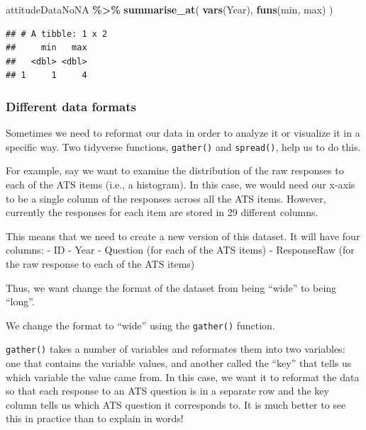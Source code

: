 \documentclass[
  12pt,
]{book}
\newenvironment{Shaded}{\begin{snugshade}}{\end{snugshade}}
\newcommand{\FunctionTok}[1]{\textcolor[rgb]{0.13,0.29,0.53}{\textbf{#1}}}
\newcommand{\NormalTok}[1]{#1}
\newcommand{\SpecialCharTok}[1]{\textcolor[rgb]{0.81,0.36,0.00}{\textbf{#1}}}
\begin{document}
\begin{Shaded}
\begin{Highlighting}[]
\NormalTok{attitudeDataNoNA }\SpecialCharTok{\%\textgreater{}\%} 
  \FunctionTok{summarise\_at}\NormalTok{(}
    \FunctionTok{vars}\NormalTok{(Year),}
    \FunctionTok{funs}\NormalTok{(min, max)}
\NormalTok{  )}
\end{Highlighting}
\end{Shaded}

\begin{verbatim}
## # A tibble: 1 x 2
##     min   max
##   <dbl> <dbl>
## 1     1     4
\end{verbatim}

\hypertarget{different-data-formats}{%
\subsubsection{Different data formats}\label{different-data-formats}}

Sometimes we need to reformat our data in order to analyze it or visualize it in a specific way. Two tidyverse functions, \texttt{gather()} and \texttt{spread()}, help us to do this.

For example, say we want to examine the distribution of the raw responses to each of the ATS items (i.e., a histogram). In this case, we would need our x-axis to be a single column of the responses across all the ATS items. However, currently the responses for each item are stored in 29 different columns.

This means that we need to create a new version of this dataset. It will have four columns:
- ID
- Year
- Question (for each of the ATS items)
- ResponseRaw (for the raw response to each of the ATS items)

Thus, we want change the format of the dataset from being ``wide'' to being ``long''.

We change the format to ``wide'' using the \texttt{gather()} function.

\texttt{gather()} takes a number of variables and reformates them into two variables: one that contains the variable values, and another called the ``key'' that tells us which variable the value came from. In this case, we want it to reformat the data so that each response to an ATS question is in a separate row and the key column tells us which ATS question it corresponds to. It is much better to see this in practice than to explain in words!
\end{document}
